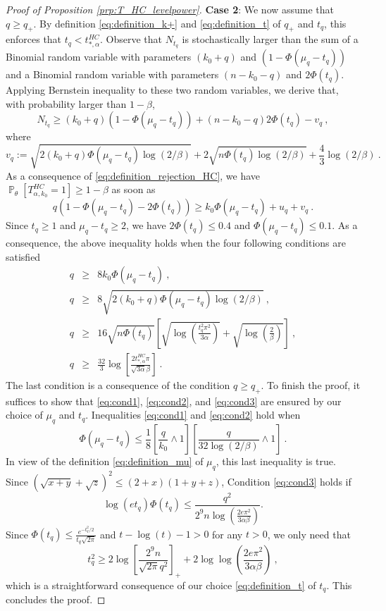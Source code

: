 \documentclass[twoside,11pt]{article}
\renewcommand{\P}{\operatorname{\mathbb{P}}}
\newcommand{\<}{\langle}
\renewcommand{\>}{\rangle}
\begin{document}
\begin{proof}[Proof of Proposition \ref{prp:T_HC_levelpower}]
 \noindent 
 {\bf Case 2}: We now assume that $q\geq q_+$. By definition \eqref{eq:definition_k+} and \eqref{eq:definition_t} of $q_+$ and $t_q$, this enforces that $t_q< t^{HC}_{*,\alpha}$. Observe that $N_{t_q}$ is stochastically larger than the sum of a Binomial random variable with parameters $(k_0+q)$ and $(1-\Phi(\mu_q-t_q))$ and a Binomial random variable with parameters $(n-k_0-q)$ and $2\Phi(t_q)$. Applying Bernstein inequality to these two random variables, we derive that,
 with probability larger than $1-\beta$, 
\[
 N_{t_q} \geq (k_0+q)(1-\Phi(\mu_q-t_q))+ (n-k_0-q)2\Phi(t_q)-  v_{q}\ ,
\]
where 
\[v_{q}:=  \sqrt{2(k_0+q)\Phi(\mu_q-t_q)\log(2/\beta)}+ 2\sqrt{n\Phi(t_q)\log(2/\beta)} +  \frac{4}{3}\log(2/\beta)\ .\]
As a consequence of \eqref{eq:definition_rejection_HC}, we have $\P_{\theta}[T^{HC}_{\alpha,k_0}=1 ]\geq 1-\beta$ as soon as
\[
 q(1-\Phi(\mu_q-t_q)-2\Phi(t_q))\geq k_0 \Phi(\mu_q-t_q)+ u_{q}+ v_{q}\ .
\]
Since $t_q\geq 1$ and $\mu_q-t_q\geq 2$, we have $2\Phi(t_q)\leq 0.4$ and $\Phi(\mu_q-t_q)\leq 0.1$. As a consequence,  the above inequality holds when the four following conditions are satisfied
 \begin{eqnarray} \label{eq:cond1}
 q &\geq& 8k_0 \Phi(\mu_q-t_q) \ , \\ \label{eq:cond2}
 q &\geq & 8 \sqrt{2(k_0+q)\Phi(\mu_q-t_q)\log(2/\beta)} \ ,\\
 q &\geq  & 16\sqrt{n\Phi(t_q)}\left[\sqrt{\log\left(\frac{t_q^2\pi^2}{3\alpha}\right)} + \sqrt{\log\left(\frac{2}{\beta}\right)}\right] \ , \label{eq:cond3}\\
 q &\geq & \frac{32}{3}\log\left[\frac{2t^{HC}_{*,\alpha}\pi }{\sqrt{3\alpha}\beta}\right]\ . \nonumber
 \end{eqnarray}
The last condition is a consequence of the condition $q \geq q_+$. To finish the proof, it suffices to show  that \eqref{eq:cond1}, \eqref{eq:cond2}, and \eqref{eq:cond3} are ensured by  our choice of $\mu_q$ and $t_q$.
Inequalities \eqref{eq:cond1} and \eqref{eq:cond2}
hold when 
\[
 \Phi(\mu_q-t_q)\leq \frac{1}{8}\left[\frac{q}{k_0}\wedge 1\right]\left[\frac{q}{32\log(2/\beta)}\wedge 1\right]\ .
 \]
 In view of the definition \eqref{eq:definition_mu} of $\mu_q$,  this last inequality is true.
  Since $(\sqrt{x+y}+\sqrt{z})^2\leq (2+x)(1+y+z)$, Condition \eqref{eq:cond3} holds if
 \[
 \log(et_q)\Phi(t_q)\leq \frac{q^2}{2^9n\log(\frac{2e\pi^2}{3\alpha\beta})}.
\]
Since $\Phi(t_q)\leq \tfrac{e^{-t_q^2/2}}{t_q\sqrt{2\pi}}$ and $t- \log(t)-1>0$ for any $t>0$, we only need that
\[
 t_q^2 \geq  2 \log\left[\frac{2^9 n}{\sqrt{2\pi}q^2}\right]_{+} + 2\log\log(\frac{2e\pi^2}{3\alpha\beta})\ ,
\]
which is a straightforward consequence of  our choice \eqref{eq:definition_t} of $t_q$. This concludes the proof.

 
 
 
 
\end{proof}
\end{document}
